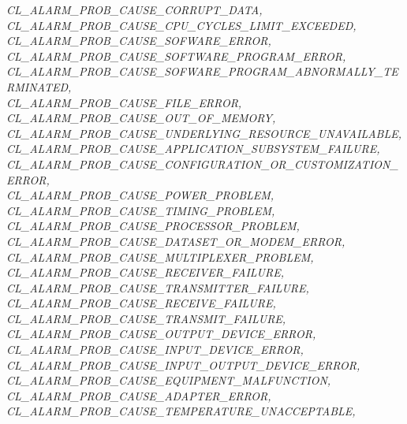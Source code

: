 \begin{flushleft}
\begin{tabbing}
\>\>\>\>\textit{CL\_ALARM\_PROB\_CAUSE\_CORRUPT\_DATA,}\\
\>\>\>\>\textit{CL\_ALARM\_PROB\_CAUSE\_CPU\_CYCLES\_LIMIT\_EXCEEDED,}\\
\>\>\>\>\textit{CL\_ALARM\_PROB\_CAUSE\_SOFWARE\_ERROR,}\\
\>\>\>\>\textit{CL\_ALARM\_PROB\_CAUSE\_SOFTWARE\_PROGRAM\_ERROR,}\\
\>\>\>\>\textit{CL\_ALARM\_PROB\_CAUSE\_SOFWARE\_PROGRAM\_ABNORMALLY\_TERMINATED,}\\
\>\>\>\>\textit{CL\_ALARM\_PROB\_CAUSE\_FILE\_ERROR,}\\
\>\>\>\>\textit{CL\_ALARM\_PROB\_CAUSE\_OUT\_OF\_MEMORY,}\\
\>\>\>\>\textit{CL\_ALARM\_PROB\_CAUSE\_UNDERLYING\_RESOURCE\_UNAVAILABLE,}\\
\>\>\>\>\textit{CL\_ALARM\_PROB\_CAUSE\_APPLICATION\_SUBSYSTEM\_FAILURE,}\\
\>\>\>\>\textit{CL\_ALARM\_PROB\_CAUSE\_CONFIGURATION\_OR\_CUSTOMIZATION\_ERROR,}\\
\>\>\>\>\textit{CL\_ALARM\_PROB\_CAUSE\_POWER\_PROBLEM,}\\
\>\>\>\>\textit{CL\_ALARM\_PROB\_CAUSE\_TIMING\_PROBLEM,}\\
\>\>\>\>\textit{CL\_ALARM\_PROB\_CAUSE\_PROCESSOR\_PROBLEM,}\\
\>\>\>\>\textit{CL\_ALARM\_PROB\_CAUSE\_DATASET\_OR\_MODEM\_ERROR,}\\
\>\>\>\>\textit{CL\_ALARM\_PROB\_CAUSE\_MULTIPLEXER\_PROBLEM,}\\
\>\>\>\>\textit{CL\_ALARM\_PROB\_CAUSE\_RECEIVER\_FAILURE,}\\
\>\>\>\>\textit{CL\_ALARM\_PROB\_CAUSE\_TRANSMITTER\_FAILURE,}\\
\>\>\>\>\textit{CL\_ALARM\_PROB\_CAUSE\_RECEIVE\_FAILURE,}\\
\>\>\>\>\textit{CL\_ALARM\_PROB\_CAUSE\_TRANSMIT\_FAILURE,}\\
\>\>\>\>\textit{CL\_ALARM\_PROB\_CAUSE\_OUTPUT\_DEVICE\_ERROR,}\\
\>\>\>\>\textit{CL\_ALARM\_PROB\_CAUSE\_INPUT\_DEVICE\_ERROR,}\\
\>\>\>\>\textit{CL\_ALARM\_PROB\_CAUSE\_INPUT\_OUTPUT\_DEVICE\_ERROR,}\\
\>\>\>\>\textit{CL\_ALARM\_PROB\_CAUSE\_EQUIPMENT\_MALFUNCTION,}\\
\>\>\>\>\textit{CL\_ALARM\_PROB\_CAUSE\_ADAPTER\_ERROR,}\\
\>\>\>\>\textit{CL\_ALARM\_PROB\_CAUSE\_TEMPERATURE\_UNACCEPTABLE,}\\

\end{tabbing}
\end{flushleft}
